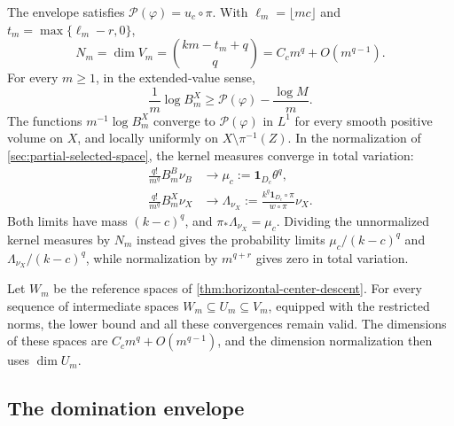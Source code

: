 \begin{theorem}\label{thm:horizontal-projective-kernels}
The envelope satisfies $\mathcal P(\varphi)=u_c\circ\pi$. With
$\ell_m=\lfloor mc\rfloor$ and $t_m=\max\{\ell_m-r,0\}$,
\[
 N_m=\dim V_m=\binom{km-t_m+q}{q}
       =C_cm^q+O(m^{q-1}).
\]
For every $m\geq1$, in the extended-value sense,
\begin{equation}\label{eq:horizontal-kernel-lower}
 \frac1m\log B_m^X\geq\mathcal P(\varphi)-\frac{\log M}{m}.
\end{equation}
The functions $m^{-1}\log B_m^X$ converge to $\mathcal P(\varphi)$ in $L^1$ for every smooth positive volume on $X$, and locally uniformly on $X\setminus\pi^{-1}(Z)$. In the normalization of \cref{sec:partial-selected-space}, the kernel measures converge in total variation:
\begin{equation}\label{eq:horizontal-kernel-tv}
 \begin{split}
 \frac{q!}{m^q}B_m^B\nu_B&\longrightarrow\mu_c:=\mathbf1_{D_c}\theta^q,\\
 \frac{q!}{m^q}B_m^X\nu_X&\longrightarrow
       \Lambda_{\nu_X}:=\frac{k^q\mathbf1_{D_c}\circ\pi}{w\circ\pi}\nu_X.
 \end{split}
\end{equation}
Both limits have mass $(k-c)^q$, and $\pi_*\Lambda_{\nu_X}=\mu_c$. Dividing the unnormalized kernel measures by $N_m$ instead gives the probability limits $\mu_c/(k-c)^q$ and $\Lambda_{\nu_X}/(k-c)^q$, while normalization by $m^{q+r}$ gives zero in total variation.

Let $W_m$ be the reference spaces of \cref{thm:horizontal-center-descent}. For every sequence of intermediate spaces $W_m\subseteq U_m\subseteq V_m$, equipped with the restricted norms, the lower bound and all these convergences remain valid. The dimensions of these spaces are $C_cm^q+O(m^{q-1})$, and the dimension normalization then uses $\dim U_m$.
\end{theorem}

\subsection{The domination envelope}

